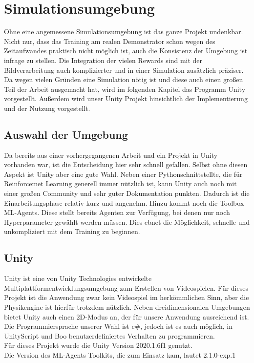 \chapter{Simulationsumgebung}  
\label{ch:Simulationsumgebung}
Ohne eine angemessene Simulationsumgebung ist das ganze Projekt undenkbar. Nicht nur, dass das Training am realen Demonstrator schon wegen des Zeitaufwandes praktisch nicht möglich ist, auch die Konsistenz der Umgebung ist infrage zu stellen.
Die Integration der vielen Rewards sind mit der Bildverarbeitung auch komplizierter und in einer Simulation zusätzlich präziser.
Da wegen vielen Gründen eine Simulation nötig ist und diese auch einen großen Teil der Arbeit ausgemacht hat, wird im folgenden Kapitel das Programm Unity vorgestellt. Außerdem wird unser Unity Projekt hinsichtlich der Implementierung und der Nutzung vorgestellt.

\section{Auswahl  der Umgebung}
\label{sect:Auswahl  der Umgebung}
Da bereits aus einer vorhergegangenen Arbeit und ein Projekt in Unity vorhanden war, ist die Entscheidung hier sehr schnell gefallen.
Selbst ohne diesen Aspekt ist Unity aber eine gute Wahl. Neben einer Pythonschnittstellte, die für Reinforcemet Learning generell immer nützlich ist, kann Unity auch noch mit einer großen Community und sehr guter Dokumentation punkten. Dadurch ist die Einarbeitungsphase relativ kurz und angenehm. Hinzu kommt noch die Toolbox ML-Agents. Diese stellt bereits Agenten zur Verfügung, bei denen nur noch Hyperparameter gewählt werden müssen. Dies ebnet die Möglichkeit, schnelle und unkompliziert mit dem Training zu beginnen.

\section{Unity}
\label{sect:Unity}
Unity ist eine von Unity Technologies entwickelte Multiplattformentwicklungsumgebung zum Erstellen von Videospielen. Für dieses Projekt ist die Anwendung zwar kein Videospiel im herkömmlichen Sinn, aber die Physikengine ist hierfür trotzdem nützlich. Neben dreidimensionalen Umgebungen bietet Unity auch einen 2D-Modus an, der für unsere Anwendung ausreichend ist. Die Programmiersprache unserer Wahl ist c\#, jedoch ist es auch möglich, in UnityScript und Boo benutzerdefiniertes Verhalten zu programmieren.\\
Für dieses Projekt wurde die Unity Version 2020.1.6f1 genutzt.\\
Die Version des ML-Agents Toolkits, die zum Einsatz kam, lautet 2.1.0-exp.1

